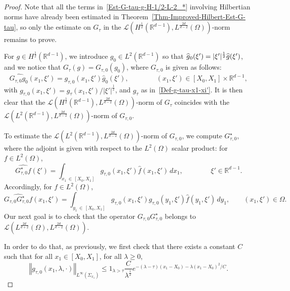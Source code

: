 \documentclass[AHL,Unicode,longabstracts]{cedram}
\newcommand{\scL}{\mathscr{L}}
\newcommand*\R{\mathbb{R}}
\newcommand{\norm}[1]{\left\Vert#1\right\Vert}
\renewcommand{\leq}{\leqslant}
\renewcommand{\geq}{\geqslant}
\renewcommand{\hat}{\widehat}
\let\oldhat\hat
\renewcommand*{\hat}[1]{\mathchoice{\widehat{#1}}{\widehat{#1}}{\oldhat{#1}}{\oldhat{#1}}}
\begin{document}
\begin{proof}
Note that all the terms in~\eqref{Est-G-tau-g-H-1/2-L-2_*} involving Hilbertian norms have already been estimated in Theorem~\ref{Thm-Improved-Hilbert-Est-G-tau}, so only the estimate on $G_\tau$ in the 
\newline
$\scL(H^{\frac{1}{2}}(\R^{d-1}), L^{\frac{2d}{d-2}}(\Omega))$-norm remains to prove.

For $g \in H^{\frac{1}{2}}(\R^{d-1})$, we introduce $g_0 \in L^2(\R^{d-1})$ so that $\hat g_0 (\xi') = |\xi'|^{\frac{1}{2}} \hat g(\xi')$, and we notice that $G_\tau (g) = G_{\tau,0}(g_0)$, where $G_{\tau, 0}$ is given as follows:
\[
\widehat{G_{\tau,0} g_0} (x_1, \xi') = g_{\tau,0} (x_1, \xi') \widehat g_0(\xi'), \qquad \qquad(x_1, \xi') \in [X_0, X_1] \times \R^{d-1},
\]
with $ g_{\tau,0} (x_1, \xi') = {g_{\tau}(x_1, \xi') }/{|\xi'|^{\frac{1}{2}}}$, and $g_\tau$ as in~\eqref{Def-g-tau-x1-xi'}. It is then clear that the $\scL(H^{\frac{1}{2}}(\R^{d-1}), L^{\frac{2d}{d-2}}(\Omega))$-norm of $G_\tau$ coincides with the $\scL(L^2(\R^{d-1}), L^{\frac{2d}{d-2}}(\Omega))$-norm of $G_{\tau,0}$.

To estimate the $\scL(L^2(\R^{d-1}), L^{\frac{2d}{d-2}}(\Omega))$-norm of $G_{\tau,0}$, we compute $G_{\tau,0}^\star$, where the adjoint is given with respect to the $L^2(\Omega)$ scalar product: for $f \in L^2(\Omega)$,
\[
\widehat{G_{\tau,0}^\star f}(\xi') = \int_{x_1 \,\in\,[X_0, X_1]} g_{\tau,0} (x_1,\xi') \widehat f(x_1, \xi') \, dx_1, \qquad \qquad\xi' \in \R^{d-1}.
\]
Accordingly, for $f \in L^2(\Omega)$,
\[
\widehat{G_{\tau,0} G_{\tau,0}^\star f} (x_1, \xi') = \int_{y_1\,\in\,[X_0, X_1] }g_{\tau,0}\left(x_1, \xi'\right) g_{\tau,0}\left(y_1, \xi'\right) \widehat f\left(y_1, \xi'\right) \, dy_1,
\qquad (x_1, \xi') \in \Omega.
\]
Our next goal is to check that the operator $ G_{\tau,0} G_{\tau,0}^\star$ belongs to $\scL(L^{\frac{2d}{d+2}}(\Omega), L^{\frac{2d}{d-2}}(\Omega))$.

In order to do that, as previously, we first check that there exists a constant $C$ such that for all $x_1 \in [X_0, X_1]$, for all $\lambda \geq 0$,
\begin{equation}\label{Est-g-tau-0}
\norm{ g_{\tau,0}(x_1,\lambda, \cdot)}_{L^\infty\left(\Sigma_{x_1}\right)}
\leq 1_{\lambda > \tau} \frac{C}{\lambda^{\frac{1}{2}}} e^{-(\lambda - \tau)(x_1 - X_0) - \lambda (x_1 - X_0)^2/C}.
\end{equation}


\end{proof}
\end{document}
